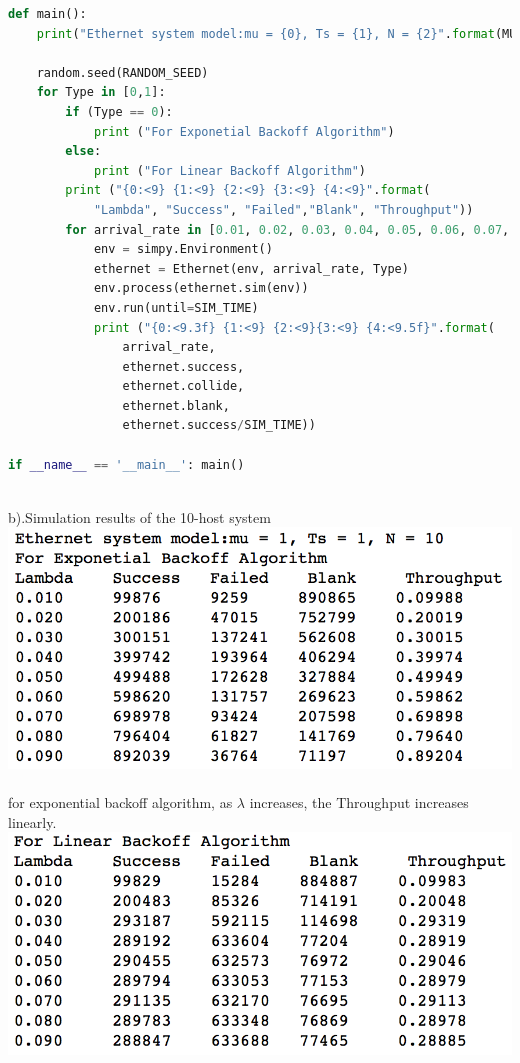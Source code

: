 \documentclass[paper=a4, fontsize=11pt]{scrartcl}
\numberwithin{equation}{section} %
\numberwithin{figure}{section} %
\numberwithin{table}{section} %
\begin{document}
\begin{lstlisting}[language=Python]
def main():
	print("Ethernet system model:mu = {0}, Ts = {1}, N = {2}".format(MU, TS, N_HOST))

	random.seed(RANDOM_SEED)
	for Type in [0,1]:
		if (Type == 0):
			print ("For Exponetial Backoff Algorithm")
		else:
			print ("For Linear Backoff Algorithm")
		print ("{0:<9} {1:<9} {2:<9} {3:<9} {4:<9}".format(
			"Lambda", "Success", "Failed","Blank", "Throughput"))
		for arrival_rate in [0.01, 0.02, 0.03, 0.04, 0.05, 0.06, 0.07, 0.08, 0.09]:
			env = simpy.Environment()
			ethernet = Ethernet(env, arrival_rate, Type)
			env.process(ethernet.sim(env))
			env.run(until=SIM_TIME)
			print ("{0:<9.3f} {1:<9} {2:<9}{3:<9} {4:<9.5f}".format(
				arrival_rate,
				ethernet.success,
				ethernet.collide,
				ethernet.blank,
				ethernet.success/SIM_TIME))
	
if __name__ == '__main__': main()
    \end{lstlisting}
    \\b).Simulation results of the 10-host system\\
        \includegraphics[scale=0.8]{c}\\\\
        for exponential backoff algorithm, as $\lambda$ increases, the Throughput increases linearly.
        \includegraphics[scale=0.8]{d}\\\\
\end{document}
